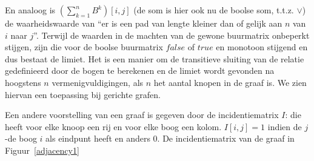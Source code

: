 En analoog is $(\sum_{k=1}^{n} B^{k})[i,j]$ (de som is hier ook nu de boolse
som, t.t.z. $\vee$) de waarheidswaarde van ``er is een pad
van lengte kleiner dan of gelijk aan $n$ van $i$ naar $j$''. 
Terwijl
de waarden in de machten van de gewone buurmatrix onbeperkt
stijgen, zijn die voor de boolse buurmatrix $false$ of $true$ en
monotoon stijgend en dus bestaat
de limiet.
Het is een manier om de
transitieve sluiting van de relatie gedefinieerd door de bogen te
berekenen en
de limiet
wordt gevonden na hoogstens $n$
vermenigvuldigingen, als $n$ het aantal knopen in de graaf is. We zien
hiervan een toepassing bij gerichte grafen.

Een andere voorstelling van een graaf is gegeven door de incidentiematrix 
$I$: die heeft voor elke knoop een rij en voor elke boog een
kolom. $I[i,j] = 1$ indien de $j$-de boog $i$ als eindpunt heeft en anders 0.
De incidentiematrix van de graaf in Figuur~\ref{adjacency1}

